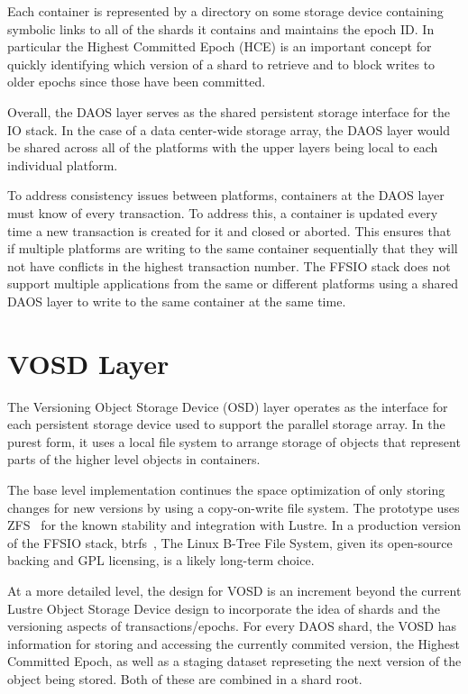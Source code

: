\documentclass[conference]{IEEEtran}
\begin{document}
Each container is represented by a directory on some storage device containing
symbolic links to all of the shards it contains and maintains the epoch ID.
In particular the Highest Committed Epoch (HCE) is an important concept for
quickly identifying which version of a shard to retrieve and to block writes to
older epochs since those have been committed.

Overall, the DAOS layer serves as the shared persistent storage interface for
the IO stack. In the case of a data center-wide storage array, the DAOS layer
would be shared across all of the platforms with the upper layers being local
to each individual platform.

To address consistency issues between platforms, containers at the DAOS layer
must know of every transaction. To address this, a container is updated every
time a new transaction is created for it and closed or aborted. This ensures
that if multiple platforms are writing to the same container sequentially that
they will not have conflicts in the highest transaction number. The FFSIO stack
does not support multiple applications from the same or different platforms
using a shared DAOS layer to write to the same container at the same time.

\section{VOSD Layer}
\label{sec:vosd}

The Versioning Object Storage Device (OSD) layer operates as the interface for
each persistent storage device used to support the parallel storage array. In
the purest form, it uses a local file system to arrange storage of objects that
represent parts of the higher level objects in containers.

The base level implementation continues the space optimization of only storing
changes for new versions by using a copy-on-write file system. The prototype
uses ZFS~\cite{zhang:2010:zfs} for the known stability and integration with
Lustre. In a production version of the FFSIO stack,
btrfs~\cite{rodeh:2013:btrfs}, The Linux B-Tree File System, given its
open-source backing and GPL licensing, is a likely long-term choice.

At a more detailed level, the design for VOSD is an increment beyond the
current Lustre Object Storage Device design to incorporate the idea of shards
and the versioning aspects of transactions/epochs. For every DAOS shard, the
VOSD has information for storing and accessing the currently commited version,
the Highest Committed Epoch, as well as a staging dataset represeting the
next version of the object being stored. Both of these are combined in a shard
root.
\end{document}
